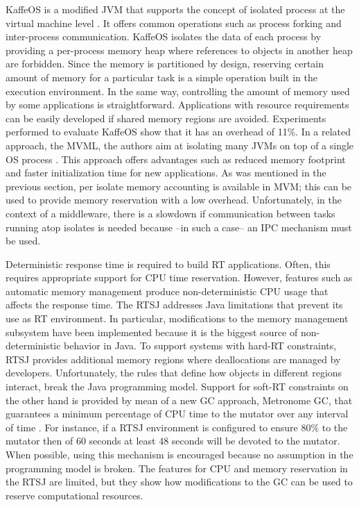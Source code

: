 KaffeOS is a modified JVM that supports the concept of isolated process at the virtual machine level \cite{back_processes_2000, Back:2005:KJR:1075382.1075383}.
It offers common operations such as process forking and inter-process communication.
KaffeOS isolates the data of each process by providing a per-process memory heap where references to objects in another heap are forbidden.
Since the memory is partitioned by design, reserving certain amount of memory for a particular task is a simple operation built in the execution environment.
In the same way, controlling the amount of memory used by some applications is straightforward.
Applications with resource requirements can be easily developed if shared memory regions are avoided.
Experiments performed to evaluate KaffeOS show that it has an overhead of 11\%.
In a related approach, the \gls{MVML}, the authors aim at isolating many JVMs on top of
a single OS process \cite{czajkowski_multitasking_2001}.
This approach offers advantages such as reduced memory footprint and faster initialization time for new applications.
As was mentioned in the previous section, per isolate memory accounting is available in MVM;
this can be used to provide memory reservation with a low overhead. 
Unfortunately, in the context of a middleware, there is a slowdown if communication between tasks running atop isolates is needed because --in such a case-- an \gls{IPC} mechanism must be used.


Deterministic response time is required to build \gls{RT} applications.
Often, this requires appropriate support for CPU time reservation. 
However, features such as automatic memory management produce non-deterministic CPU usage that affects the response time.
The \gls{RTSJ} addresses Java limitations that prevent its use as RT environment.
In particular, modifications to the memory management subsystem have been implemented because it is the biggest source of non-deterministic behavior in Java.
To support systems with hard-RT constraints, RTSJ provides additional memory regions where deallocations are managed by developers.
Unfortunately, the rules that define how objects in different regions interact, break the Java programming model.
Support for soft-RT constraints on the other hand is provided by mean of a new GC approach, Metronome GC,  that guarantees a minimum percentage of CPU time to the mutator over any interval of time \cite{Bacon03themetronome:}.
For instance, if a RTSJ environment is configured to ensure 80$\%$ to the mutator then of 60 seconds at least 48 seconds will be devoted to the mutator.
When possible, using this mechanism is encouraged because no assumption in the programming model is broken.
The features for CPU and memory reservation in the RTSJ are limited, but they show how modifications to the GC can be used to reserve computational resources. 


